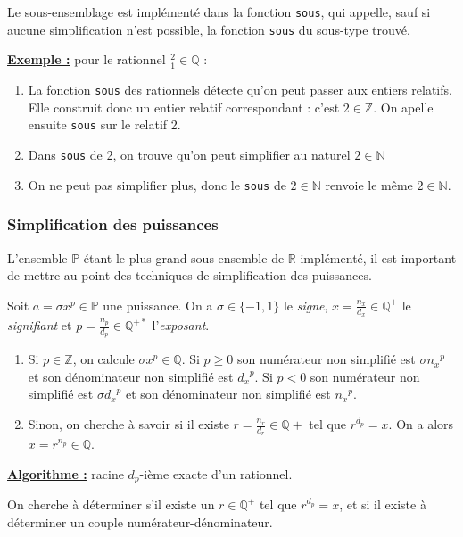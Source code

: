 \documentclass[french]{article}
\newcommand{\p}{\texttt} %
\newcommand{\exemple}{\textbf{\underline{Exemple :} }}
\begin{document}
Le sous-ensemblage est implémenté dans la fonction \p{sous}, qui appelle, sauf si aucune simplification n'est possible, la fonction \p{sous} du sous-type trouvé. \clearpage


\noindent \exemple pour le rationnel $\frac{2}{1} \in \mathbb{Q}$ :
\begin{enumerate}
  \item La fonction \p{sous} des rationnels détecte qu'on peut passer aux entiers relatifs. Elle construit donc un entier relatif correspondant : c'est $2 \in \mathbb{Z}$. On apelle ensuite \p{sous} sur le relatif 2.
  \item Dans \p{sous} de 2, on trouve qu'on peut simplifier au naturel $2 \in \mathbb{N}$
  \item On ne peut pas simplifier plus, donc le \p{sous} de $2 \in \mathbb{N}$ renvoie le même $2 \in \mathbb{N}$.
\end{enumerate}

\subsubsection{Simplification des puissances}

L'ensemble $\mathbb{P}$ étant le plus grand sous-ensemble de $\mathbb{R}$ implémenté, il est important de mettre au point des techniques de simplification des puissances.

Soit $a = \sigma x ^ p \in \mathbb{P}$ une puissance. On a $\sigma \in \{-1, 1\}$ le \textit{signe}, $x = \frac{n_x}{d_x} \in \mathbb{Q}^+$ le \textit{signifiant} et $p = \frac{n_p}{d_p} \in \mathbb{Q}^{+*}$ l'\textit{exposant}.

\begin{enumerate}
  \item Si $p \in \mathbb{Z}$, on calcule $\sigma x ^ p \in \mathbb{Q}$. Si $p \ge 0$ son numérateur non simplifié est $\sigma {n_x}^p$ et son dénominateur non simplifié est ${d_x}^p$. Si $p < 0$ son numérateur non simplifié est $\sigma {d_x}^p$ et son dénominateur non simplifié est ${n_x}^p$.
  \item Sinon, on cherche à savoir si il existe $r = \frac{n_r}{d_r} \in \mathbb{Q}+$ tel que $r^{d_p} = x$. On a alors $x = r^{n_p} \in \mathbb{Q}$.
\end{enumerate}

\noindent \textbf{\underline{Algorithme :}} racine $d_p$-ième exacte d'un rationnel.

\noindent On cherche à déterminer s'il existe un $r \in \mathbb{Q}^+$ tel que $r^{d_p} = x$, et si il existe à déterminer un couple numérateur-dénominateur.
\end{document}
